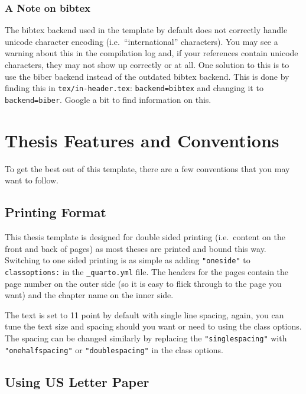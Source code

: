 \documentclass[
  letterpaper,
  11pt,
  english,
  singlespacing,
  headsepline]{MastersDoctoralThesis}
\begin{document}
\subsubsection{A Note on bibtex}\label{a-note-on-bibtex-1}

The bibtex backend used in the template by default does not correctly
handle unicode character encoding (i.e.~``international'' characters).
You may see a warning about this in the compilation log and, if your
references contain unicode characters, they may not show up correctly or
at all. One solution to this is to use the biber backend instead of the
outdated bibtex backend. This is done by finding this in
\texttt{tex/in-header.tex}: \texttt{backend=bibtex} and changing it to
\texttt{backend=biber}. Google a bit to find information on this.

\section{Thesis Features and Conventions}\label{sec-ThesisConventions}

To get the best out of this template, there are a few conventions that
you may want to follow.

\subsection{Printing Format}\label{printing-format-1}

This thesis template is designed for double sided printing (i.e.~content
on the front and back of pages) as most theses are printed and bound
this way. Switching to one sided printing is as simple as adding
\texttt{"oneside"} to \texttt{classoptions:} in the
\texttt{\_quarto.yml} file. The headers for the pages contain the page
number on the outer side (so it is easy to flick through to the page you
want) and the chapter name on the inner side.

The text is set to 11 point by default with single line spacing, again,
you can tune the text size and spacing should you want or need to using
the class options. The spacing can be changed similarly by replacing the
\texttt{"singlespacing"} with \texttt{"onehalfspacing"} or
\texttt{"doublespacing"} in the class options.

\subsection{Using US Letter Paper}\label{using-us-letter-paper-1}
\end{document}
